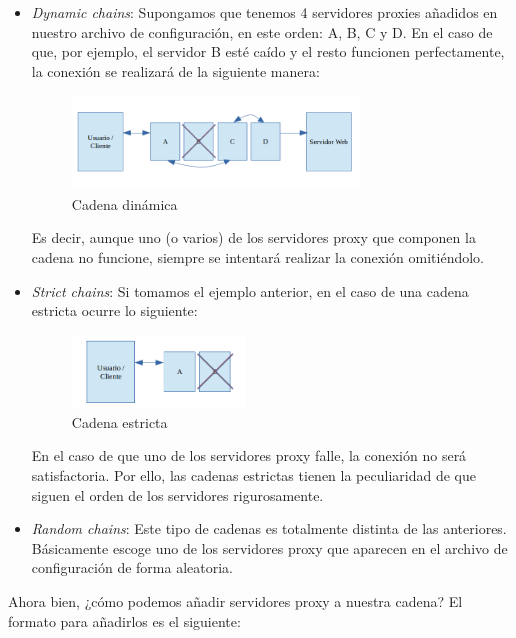 \begin{itemize}
	\item \textit{Dynamic chains}: Supongamos que tenemos 4 servidores proxies añadidos en nuestro archivo de configuración, en este orden: A, B, C y D.
	En el caso de que, por ejemplo, el servidor B esté caído y el resto funcionen perfectamente, la conexión se realizará de la siguiente manera:
	
	\begin{figure}[h]
		\centerline{
			\mbox{\includegraphics[width=3.00in]{images/proxy_dynamic.png}}
		}
		\caption{Cadena dinámica}
		\label{fig:dyn_chain}
	\end{figure}
		
	Es decir, aunque uno (o varios) de los servidores proxy que componen la cadena no funcione, siempre se intentará realizar la conexión omitiéndolo.
	
	\item \textit{Strict chains}: Si tomamos el ejemplo anterior, en el caso de una cadena estricta ocurre lo siguiente:
	
	\begin{figure}[h]
		\centerline{
			\mbox{\includegraphics[width=1.80in]{images/proxy_strict.png}}
		}
		\caption{Cadena estricta}
		\label{fig:strict_chain}
	\end{figure}
			
	En el caso de que uno de los servidores proxy falle, la conexión no será satisfactoria. Por ello, las cadenas estrictas tienen la peculiaridad de que siguen el orden de los servidores rigurosamente.
	
	\item \textit{Random chains}: Este tipo de cadenas es totalmente distinta de las anteriores. Básicamente escoge uno de los servidores proxy que aparecen en el archivo de configuración de forma aleatoria.
\end{itemize}

Ahora bien, ¿cómo podemos añadir servidores proxy a nuestra cadena?
El formato para añadirlos es el siguiente:


